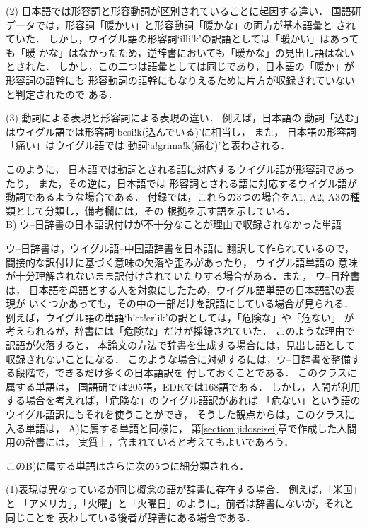 {(2) 日本語では形容詞と形容動詞が区別されていることに起因する違い． 
国語研データでは，形容詞「暖かい」と形容動詞「暖かな」の両方が基本語彙と
されていた．
しかし，ウイグル語の形容詞`illi!k'の訳語としては「暖かい」はあっても「暖
かな」はなかったため，逆辞書においても「暖かな」の見出し語はないとされた．
しかし，この二つは語彙としては同じであり，日本語の「暖か」が形容詞の語幹にも
形容動詞の語幹にもなりえるために片方が収録されていないと判定されたので
ある．

(3) 動詞による表現と形容詞による表現の違い． 例えば，日本語の
動詞「込む」はウイグル語では形容詞`besi!k(込んでいる)'に相当し，
また，
日本語の形容詞「痛い」はウイグル語では
動詞`a!grima!k(痛む)'と表わされる．

このように，
日本語では動詞とされる語に対応するウイグル語が形容詞であったり，
また，その逆に，日本語では
形容詞とされる語に対応するウイグル語が動詞であるような場合である．
付録\cite{JUDIC_APPENDIX}では，これらの3つの場合をA1, A2, A3の種類として分類し，備考欄には，その
根拠を示す語を示している．\\

B) ウ--日辞書の日本語訳付けが不十分なことが理由で収録されなかった単語

ウ--日辞書\cite{UJDIC}は，ウイグル語--中国語辞書\cite{UHDIC}を日本語に
翻訳して作られているので，間接的な訳付けに基づく意味の欠落や歪みがあったり，
ウイグル語単語の
意味が十分理解されないまま訳付けされていたりする場合がある．また，
ウ--日辞書\mbox{\cite{UJDIC}}は，
日本語を母語とする人を対象にしたため，ウイグル語単語の日本語訳の表現が
いくつかあっても，その中の一部だけを訳語にしている場合が見られる．
例えば，ウイグル語の単語`h!et!erlik'の訳としては，「危険な」や「危ない」
が考えられるが，辞書には「危険な」だけが採録されていた．
このような理由で訳語が欠落すると，
本論文の方法で辞書を生成する場合には，見出し語として収録されないことになる．
このような場合に対処するには，ウ--日辞書を整備する段階で，できるだけ多くの日本語訳を
付しておくことである．
このクラスに属する単語は，
国語研では205語，EDRでは168語である．
しかし，人間が利用する場合を考えれば，「危険な」のウイグル語訳があれば
「危ない」という語のウイグル語訳にもそれを使うことができ，
そうした観点からは，このクラスに入る単語は，
A)に属する単語と同様に，
第\ref{section:jidoseisei}章で作成した人間用の辞書には，
実質上，含まれていると考えてもよいであろう．

このB)に属する単語はさらに次の5つに細分類される．

(1)表現は異なっているが同じ概念の語が辞書に存在する場合． 例えば，「米国」と
「アメリカ」，「火曜」と「火曜日」のように，前者は辞書にないが，それと同じことを
表わしている後者が辞書にある場合である．

}
